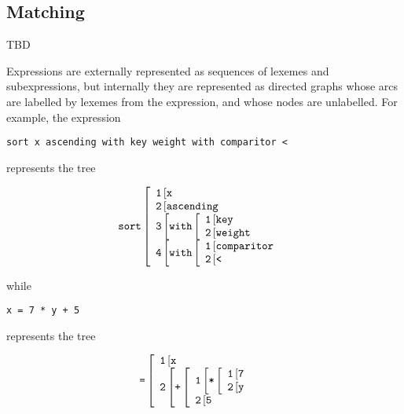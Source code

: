 \documentclass[12pt]{article}
\begin{document}
\subsection{Matching}
\label{MATCHING}

TBD

Expressions are externally represented as sequences of lexemes and
subexpressions, but internally they are represented as directed graphs whose
arcs are labelled by lexemes from the expression, and
whose nodes are unlabelled.  For example, the expression

\begin{center}
\verb|sort x ascending with key weight with comparitor <|
\end{center}

represents the tree

\[
    \verb|sort| \left[
	\begin{array}{l}
        \verb|1| \left[ \verb|x| \right. \\
        \verb|2| \left[ \verb|ascending| \right. \\
        \verb|3| \left[ \verb|with| \left[
	    \begin{array}{l}
	    \verb|1| \left[ \verb|key| \right. \\
	    \verb|2| \left[ \verb|weight| \right. \\
           \end{array} \right. \right. \\
        \verb|4| \left[ \verb|with| \left[
	    \begin{array}{l}
	    \verb|1| \left[ \verb|comparitor| \right. \\
	    \verb|2| \left[ \verb|<| \right. \\
           \end{array} \right. \right. \\
       \end{array} \right.
\]

while

\begin{center}
\verb|x = 7 * y + 5|
\end{center}

represents the tree

\[
    \verb|=| \left[
        \begin{array}{l}
	\verb|1| \left[ \verb|x| \right. \\
        \verb|2| \left[ \verb|+| \left[
	    \begin{array}{l}
	    \verb|1| \left[ \verb|*| \left[
	        \begin{array}{l}
		\verb|1| \left[ \verb|7| \right. \\
		\verb|2| \left[ \verb|y| \right. \\
		\end{array} \right. \right. \\
	    \verb|2| \left[ \verb|5| \right. \\
	    \end{array} \right. \right. \\
	\end{array} \right.
\]
\end{document}
